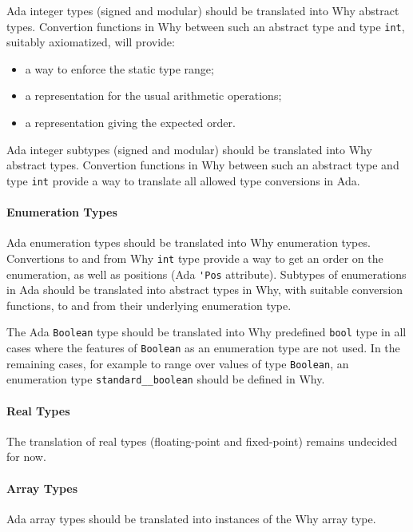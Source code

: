 \documentclass{article}
\newcounter{example}
\begin{document}
Ada integer types (signed and modular) should be translated into Why abstract
types. Convertion functions in Why between such an abstract type and type
\verb|int|, suitably axiomatized, will provide:
\begin{itemize}
\item a way to enforce the static type range;
\item a representation for the usual arithmetic operations;
\item a representation giving the expected order.
\end{itemize}

Ada integer subtypes (signed and modular) should be translated into Why
abstract types. Convertion functions in Why between such an abstract type and
type \verb|int| provide a way to translate all allowed type conversions in Ada.
 
\paragraph{Enumeration Types}

Ada enumeration types should be translated into Why enumeration
types. Convertions to and from Why \verb|int| type provide a way to get an
order on the enumeration, as well as positions (Ada \verb|'Pos|
attribute). Subtypes of enumerations in Ada should be translated into abstract
types in Why, with suitable conversion functions, to and from their underlying
enumeration type.

The Ada \verb|Boolean| type should be translated into Why predefined
\verb|bool| type in all cases where the features of \verb|Boolean| as an
enumeration type are not used. In the remaining cases, for example to range
over values of type \verb|Boolean|, an enumeration type
\verb|standard__boolean| should be defined in Why.

\paragraph{Real Types}

The translation of real types (floating-point and fixed-point) remains
undecided for now.

\paragraph{Array Types}

Ada array types should be translated into instances of the Why array type. 
\end{document}
